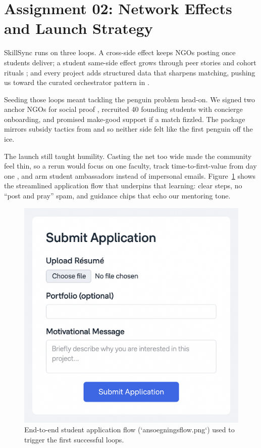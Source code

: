 \section*{Assignment 02: Network Effects and Launch Strategy}

SkillSync runs on three loops. A cross-side effect keeps NGOs posting once students deliver; a student same-side effect grows through peer stories and cohort rituals \citep{Choudary2016}; and every project adds structured data that sharpens matching, pushing us toward the curated orchestrator pattern in \citet{Reillier2017}.

Seeding those loops meant tackling the penguin problem head-on. We signed two anchor NGOs for social proof \citep{HagiuWright2013}, recruited 40 founding students with concierge onboarding, and promised make-good support if a match fizzled. The package mirrors subsidy tactics from \citet{Gunasilan2024} and \citet{FarrellSaloner1986} so neither side felt like the first penguin off the ice.

The launch still taught humility. Casting the net too wide made the community feel thin, so a rerun would focus on one faculty, track time-to-first-value from day one \citep{ShapiroVarian1999}, and arm student ambassadors instead of impersonal emails. Figure~\ref{fig:application-flow} shows the streamlined application flow that underpins that learning: clear steps, no ``post and pray'' spam, and guidance chips that echo our mentoring tone.

\begin{figure}[h]
  \centering
  \includegraphics[width=0.85\linewidth]{figures/opgave02/ansoegningsflow.png}
  \caption{End-to-end student application flow (`ansoegningsflow.png`) used to trigger the first successful loops.}
  \label{fig:application-flow}
\end{figure}
